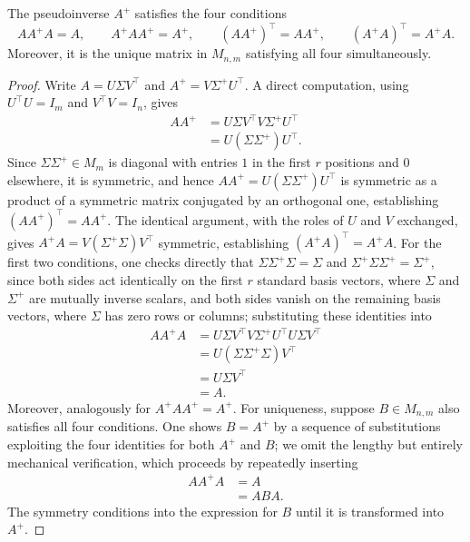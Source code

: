 \begin{theorem}
The pseudoinverse $A^{+}$ satisfies the four conditions
\[
AA^{+}A = A, \qquad A^{+}AA^{+} = A^{+}, \qquad (AA^{+})^{\top} = AA^{+}, \qquad (A^{+}A)^{\top} = A^{+}A.
\]
Moreover, it is the unique matrix in $M_{n,m}$ satisfying all four simultaneously.
\end{theorem}

\begin{proof}
Write $A = U\Sigma V^{\top}$ and $A^{+} = V\Sigma^{+}U^{\top}$. A direct computation, using $U^{\top}U = I_m$ and $V^{\top}V = I_n$, gives
\[
\begin{aligned}
AA^{+} &= U\Sigma V^{\top}V\Sigma^{+}U^{\top} \\
&= U(\Sigma \Sigma^{+})U^{\top}.
\end{aligned}
\]
Since $\Sigma\Sigma^{+} \in M_m$ is diagonal with entries $1$ in the first $r$ positions and $0$ elsewhere, it is symmetric, and hence $AA^{+} = U(\Sigma\Sigma^{+})U^{\top}$ is symmetric as a product of a symmetric matrix conjugated by an orthogonal one, establishing $(AA^{+})^{\top} = AA^{+}$. The identical argument, with the roles of $U$ and $V$ exchanged, gives $A^{+}A = V(\Sigma^{+}\Sigma)V^{\top}$ symmetric, establishing $(A^{+}A)^{\top} = A^{+}A$. For the first two conditions, one checks directly that $\Sigma\Sigma^{+}\Sigma = \Sigma$ and $\Sigma^{+}\Sigma\Sigma^{+} = \Sigma^{+}$, since both sides act identically on the first $r$ standard basis vectors, where $\Sigma$ and $\Sigma^{+}$ are mutually inverse scalars, and both sides vanish on the remaining basis vectors, where $\Sigma$ has zero rows or columns; substituting these identities into
\[
\begin{aligned}
AA^{+}A &= U\Sigma V^{\top}V\Sigma^{+}U^{\top}U\Sigma V^{\top} \\
&= U(\Sigma\Sigma^{+}\Sigma)V^{\top} \\
&= U\Sigma V^{\top} \\
&= A.
\end{aligned}
\]
Moreover, analogously for $A^{+}AA^{+} = A^{+}$. For uniqueness, suppose $B \in M_{n,m}$ also satisfies all four conditions. One shows $B = A^{+}$ by a sequence of substitutions exploiting the four identities for both $A^{+}$ and $B$; we omit the lengthy but entirely mechanical verification, which proceeds by repeatedly inserting
\[
\begin{aligned}
AA^{+}A &= A \\
&= ABA.
\end{aligned}
\]
The symmetry conditions into the expression for $B$ until it is transformed into $A^{+}$.
\end{proof}

